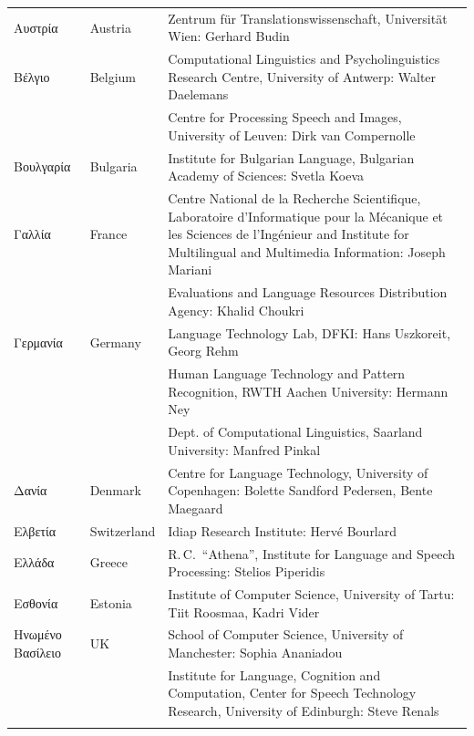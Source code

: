 \small
\begin{longtable}{@{}llp{113mm}@{}}
  Αυστρία & \textcolor{grey1}{Austria} & Zentrum für Translationswissenschaft, Universität Wien: Gerhard Budin\\ \addlinespace 
  Βέλγιο & \textcolor{grey1}{Belgium} & Computational Linguistics and Psycholinguistics Research Centre, University of Antwerp: Walter Daelemans\\ \addlinespace
  & & Centre for Processing Speech and Images, University of Leuven: Dirk van Compernolle \\ \addlinespace
  Βουλγαρία & \textcolor{grey1}{Bulgaria} & Institute for Bulgarian Language, Bulgarian Academy of Sciences: Svetla Koeva \\ \addlinespace
  Γαλλία & \textcolor{grey1}{France} & Centre National de la Recherche Scientifique, Laboratoire d'Informatique pour la Mécanique et les Sciences de l'Ingénieur and Institute for Multilingual and Multimedia Information: Joseph Mariani \\ \addlinespace
  & & Evaluations and Language Resources Distribution Agency: Khalid Choukri\\ \addlinespace 
  Γερμανία & \textcolor{grey1}{Germany} & Language Technology Lab, DFKI: Hans Uszkoreit, Georg Rehm\\ \addlinespace
  & & Human Language Technology and Pattern Recognition, RWTH Aachen University: Hermann Ney \\ \addlinespace
  & & Dept. of Computational Linguistics, Saarland University: Manfred Pinkal\\ \addlinespace Δανία &  \textcolor{grey1}{Denmark} & Centre for Language Technology, University of Copenhagen: \newline Bolette Sandford Pedersen, Bente Maegaard\\ \addlinespace
  Ελβετία & \textcolor{grey1}{Switzerland} & Idiap Research Institute: Hervé Bourlard \\ \addlinespace 
  Ελλάδα & \textcolor{grey1}{Greece} & R.\,C.~“Athena”, Institute for Language and Speech Processing: Stelios Piperidis\\ \addlinespace
  Εσθονία & \textcolor{grey1}{Estonia} & Institute of Computer Science, University of Tartu: Tiit Roosmaa, Kadri Vider\\ \addlinespace
  Ηνωμένο Βασίλειο & \textcolor{grey1}{UK} & School of Computer Science, University of Manchester: Sophia Ananiadou \\ \addlinespace 
  & & Institute for Language, Cognition and Computation, Center for Speech Technology Research, University of Edinburgh: Steve Renals \\ \addlinespace 

\end{longtable}
